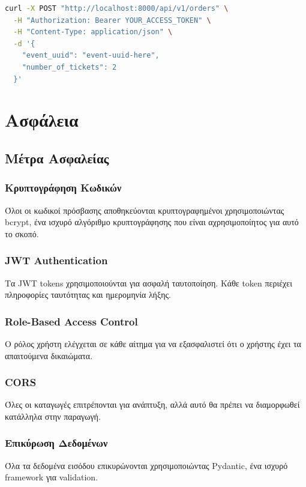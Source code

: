 \documentclass[12pt,a4paper]{report}
\begin{document}
\begin{lstlisting}[language=bash, caption=Create Order Request]
curl -X POST "http://localhost:8000/api/v1/orders" \
  -H "Authorization: Bearer YOUR_ACCESS_TOKEN" \
  -H "Content-Type: application/json" \
  -d '{
    "event_uuid": "event-uuid-here",
    "number_of_tickets": 2
  }'
\end{lstlisting}

\newpage

\chapter{Ασφάλεια}

\section{Μέτρα Ασφαλείας}

\subsection{Κρυπτογράφηση Κωδικών}
Όλοι οι κωδικοί πρόσβασης αποθηκεύονται κρυπτογραφημένοι χρησιμοποιώντας bcrypt, ένα ισχυρό αλγόριθμο κρυπτογράφησης που είναι αχρησιμοποίητος για αυτό το σκοπό.

\subsection{JWT Authentication}
Τα JWT tokens χρησιμοποιούνται για ασφαλή ταυτοποίηση. Κάθε token περιέχει πληροφορίες ταυτότητας και ημερομηνία λήξης.

\subsection{Role-Based Access Control}
Ο ρόλος χρήστη ελέγχεται σε κάθε αίτημα για να εξασφαλιστεί ότι ο χρήστης έχει τα απαιτούμενα δικαιώματα.

\subsection{CORS}
Όλες οι καταγωγές επιτρέπονται για ανάπτυξη, αλλά αυτό θα πρέπει να διαμορφωθεί κατάλληλα στην παραγωγή.

\subsection{Επικύρωση Δεδομένων}
Όλα τα δεδομένα εισόδου επικυρώνονται χρησιμοποιώντας Pydantic, ένα ισχυρό framework για validation.
\end{document}
